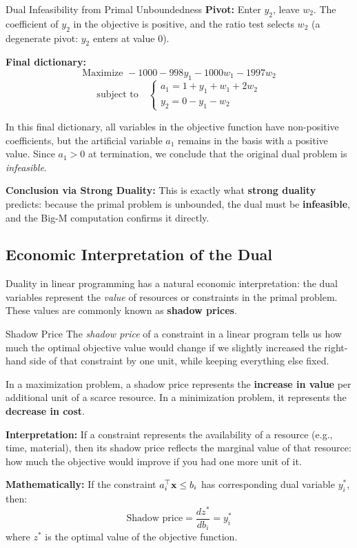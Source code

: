 \begin{example}{Dual Infeasibility from Primal Unboundedness}
\textbf{Pivot:} Enter \( y_2 \), leave \( w_2 \). The coefficient of \( y_2 \) in the objective is positive, and the ratio test selects \( w_2 \) (a degenerate pivot: \( y_2 \) enters at value \( 0 \)).

\textbf{Final dictionary:}
\[
\text{Maximize } -1000 - 998y_1 - 1000w_1 - 1997w_2
\]
\[
\text{subject to} \quad
\begin{cases}
a_1 = 1 + y_1 + w_1 + 2w_2 \\
y_2 = 0 - y_1 - w_2
\end{cases}
\]

In this final dictionary, all variables in the objective function have non-positive coefficients, but the artificial variable \( a_1 \) remains in the basis with a positive value. Since \( a_1 > 0 \) at termination, we conclude that the original dual problem is \emph{infeasible}.

\textbf{Conclusion via Strong Duality:}
This is exactly what \textbf{strong duality} predicts: because the primal problem is unbounded, the dual must be \textbf{infeasible}, and the Big-M computation confirms it directly.

\end{example}

\subsection{Economic Interpretation of the Dual}
\label{sec:duality-economic}

Duality in linear programming has a natural economic interpretation: the dual variables represent the \emph{value} of resources or constraints in the primal problem. These values are commonly known as \textbf{shadow prices}.

\vspace{1em}
\begin{definition}{Shadow Price}
The \emph{shadow price} of a constraint in a linear program tells us how much the optimal objective value would change if we slightly increased the right-hand side of that constraint by one unit, while keeping everything else fixed.

\smallskip
In a maximization problem, a shadow price represents the \textbf{increase in value} per additional unit of a scarce resource. In a minimization problem, it represents the \textbf{decrease in cost}.

\smallskip
\textbf{Interpretation:}  
If a constraint represents the availability of a resource (e.g., time, material), then its shadow price reflects the marginal value of that resource: how much the objective would improve if you had one more unit of it.

\smallskip
\textbf{Mathematically:}  
If the constraint \( a_i^\top \mathbf{x} \leq b_i \) has corresponding dual variable \( y_i^* \), then:
\[
\text{Shadow price} = \frac{d z^*}{d b_i} = y_i^*
\]
where \( z^* \) is the optimal value of the objective function.
\end{definition}


